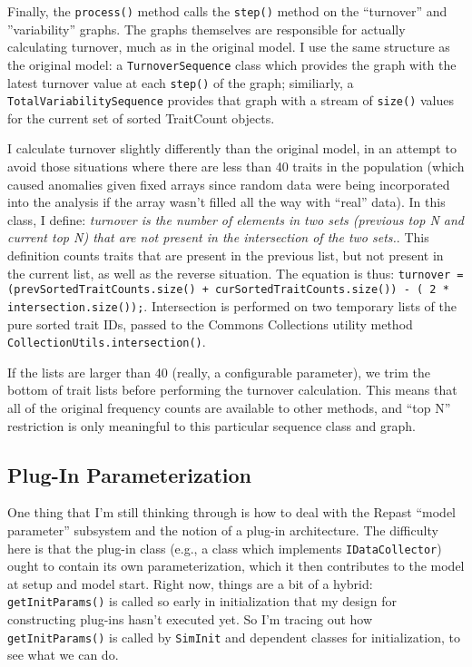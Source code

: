 \documentclass[noid]{kluwer-mem-proposal}
\begin{document}
\begin{article}
Finally, the \texttt{process()} method calls the \texttt{step()} method on the
``turnover'' and ''variability'' graphs. The graphs
themselves are responsible for actually calculating turnover, much as in the original
model.  I use the same structure as the original model:  a
\texttt{TurnoverSequence} class which provides the graph with the latest
turnover value at each \texttt{step()} of the graph; similiarly, a
\texttt{TotalVariabilitySequence} provides that graph with a stream of
\texttt{size()} values for the current set of sorted TraitCount objects.

I calculate turnover slightly differently than the original model, in an attempt
to avoid those situations where there are less than 40 traits in the population
(which caused anomalies given fixed arrays since random data were being
incorporated into the analysis if the array wasn't filled all the way with
``real'' data).  In this class, I define:  \emph{turnover is the number of
elements in two sets (previous top N and current top N) that are not present in
the intersection of the two sets.}.  This definition counts traits that are
present in the previous list, but not present in the current list, as well as
the reverse situation.  The equation is thus:  
\texttt{turnover = (prevSortedTraitCounts.size() + curSortedTraitCounts.size())
- ( 2 * intersection.size());}.  Intersection is performed on two temporary
lists of the pure sorted trait IDs, passed to the Commons Collections utility
method\\ \texttt{CollectionUtils.intersection()}.  

If the lists are larger than 40 (really, a configurable parameter), we trim the
bottom of trait lists before performing the turnover calculation.  This means
that all of the original frequency counts are available to other methods, and
``top N'' restriction is only meaningful to this particular sequence class and graph.


\subsection{Plug-In Parameterization}
One thing that I'm still thinking through is how to deal with the Repast ``model
parameter'' subsystem and the notion of a plug-in architecture.  The difficulty
here is that the plug-in class (e.g., a class which implements
\texttt{IDataCollector}) ought to contain its own parameterization, which it
then contributes to the model at setup and model start.  Right now, things are a
bit of a hybrid:  \texttt{getInitParams()} is called so early in initialization
that my design for constructing plug-ins hasn't executed yet.  So I'm tracing
out how \texttt{getInitParams()} is called by \texttt{SimInit} and dependent
classes for initialization, to see what we can do.  


\end{article}
\end{document}
